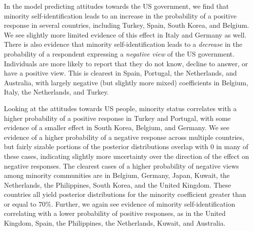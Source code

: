 
In the model predicting attitudes towards the US government, we find that minority self-identification leads to an increase in the probability of a positive response in several countries, including Turkey, Spain, South Korea, and Belgium. We see slightly more limited evidence of this effect in Italy and Germany as well. There is also evidence that minority self-identification leads to a \textit{decrease} in the probability of a respondent expressing a \textit{negative view} of the US government. Individuals are more likely to report that they do not know, decline to answer, or have a positive view. This is clearest in Spain, Portugal, the Netherlands, and Australia, with largely negative (but slightly more mixed) coefficients in Belgium, Italy, the Netherlands, and Turkey. 

Looking at the attitudes towards US people, minority status correlates with a higher probability of a positive response in Turkey and Portugal, with some evidence of a smaller effect in South Korea, Belgium, and Germany. We see evidence of a higher probability of a negative response across multiple countries, but fairly sizable portions of the posterior distributions overlap with 0 in many of these cases, indicating slightly more uncertainty over the direction of the effect on negative responses. The clearest cases of a higher probability of negative views among minority communities are in Belgium, Germany, Japan, Kuwait, the Netherlands, the Philippines, South Korea, and the United Kingdom. These countries all yield posterior distributions for the minority coefficient greater than or equal to $70\%$.  Further, we again see evidence of minority self-identification correlating with a lower probability of positive responses, as in the United Kingdom, Spain, the Philippines, the Netherlands, Kuwait, and Australia.

